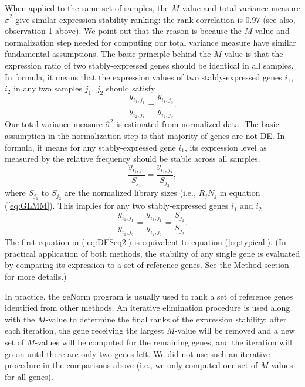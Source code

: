 \documentclass[11pt, a4paper]{article}
\begin{document}
When applied to the same set of samples, the $M$-value and total variance
measure $\hat\sigma^2$ give similar expression stability ranking: the rank
correlation is $0.97$ (see also, observation 1 above).
We point out that the reason is because the $M$-value and normalization step
needed for computing our total variance measure have similar fundamental
assumptions. 
The basic principle
behind the $M$-value is that the expression ratio of two stably-expressed
genes should be identical in all samples. In formula, it means that the
expression values of two stably-expressed genes $i_1$, $i_2$ in any two samples $j_1$, $j_2$
should satisfy
\begin{equation}\label{eq:typical}
   \dfrac{y_{i_1, j_1}}{y_{i_2, j_1}} = \dfrac{y_{i_1, j_2}}{y_{i_2, j_2}}.
\end{equation} 
Our total variance measure $\hat\sigma^2$ is estimated from normalized data.
The basic assumption in the normalization step is that majority of genes are
not DE. In formula, it means for any stably-expressed gene $i_1$, its expression
level as measured by the relative frequency should be stable across all
samples,
\begin{equation}\label{eq:DESeq} 
    \frac{y_{i_1, j_1}}{S_{j_1}}= \dfrac{y_{i_1, j_2}}{S_{j_2}},
\end{equation}
where $S_{j_1}$ to $S_{j_2}$ are the normalized library sizes (i.e., $R_j N_j$ in equation (\ref{eq:GLMM}).
This implies for any two stably-expressed genes $i_1$ and $i_2$
\begin{equation}\label{eq:DESeq2} 
    \frac{y_{i_1, j_1}}{y_{i_1, j_2}} = \frac{y_{i_2, j_1}}{y_{i_2, j_2}} =
    \frac{S_{j_1}}{S_{j_2}}.
\end{equation}
The first equation in (\ref{eq:DESeq2}) is equivalent to equation
(\ref{eq:typical}). (In practical application of both methods, the stability
of any single gene is evaluated by comparing its expression to a set of
reference genes. See the Method section for more details.)

In practice, the geNorm program \citep{vandesompele2002accurate} is usually
used to rank a set of reference genes identified from other methods.  An
iterative elimination procedure is used along with the $M$-value to determine
the final ranks of the expression stability:  after each iteration, the gene
receiving the largest $M$-value will be removed and a new set of $M$-values
will be computed for the remaining genes, and the iteration will go on until
there are only two genes left.  We did not use such an iterative procedure in
the comparisons above (i.e., we only computed one set of $M$-values for all
genes). 
\end{document}
